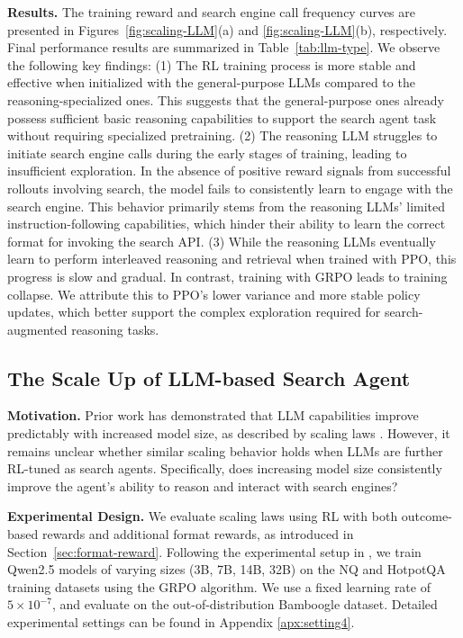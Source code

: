 \textbf{Results.}
The training reward and search engine call frequency curves are presented in Figures~\ref{fig:scaling-LLM}(a) and \ref{fig:scaling-LLM}(b), respectively.
Final performance results are summarized in Table~\ref{tab:llm-type}. We observe the following key findings:
(1) The RL training process is more stable and effective when initialized with the general-purpose LLMs compared to the reasoning-specialized ones. 
This suggests that the general-purpose ones already possess sufficient basic reasoning capabilities to support the search agent task without requiring specialized pretraining.
(2) The reasoning LLM struggles to initiate search engine calls during the early stages of training, leading to insufficient exploration. 
In the absence of positive reward signals from successful rollouts involving search, the model fails to consistently learn to engage with the search engine.
This behavior primarily stems from the reasoning LLMs' limited instruction-following capabilities, which hinder their ability to learn the correct format for invoking the search API.
(3) While the reasoning LLMs eventually learn to perform interleaved reasoning and retrieval when trained with PPO, this progress is slow and gradual. 
In contrast, training with GRPO leads to training collapse. 
We attribute this to PPO’s lower variance and more stable policy updates, which better support the complex exploration required for search-augmented reasoning tasks.

\subsection{The Scale Up of LLM-based Search Agent}\label{sec:llm-scale-up}

\textbf{Motivation.}
Prior work has demonstrated that LLM capabilities improve predictably with increased model size, as described by scaling laws \cite{hoffmann2022training, kaplan2020scaling}. However, it remains unclear whether similar scaling behavior holds when LLMs are further RL-tuned as search agents. 
Specifically, does increasing model size consistently improve the agent's ability to reason and interact with search engines?

\textbf{Experimental Design.}
We evaluate scaling laws using RL with both outcome-based rewards and additional format rewards, as introduced in Section~\ref{sec:format-reward}. 
Following the experimental setup in \cite{jin2025search}, we train Qwen2.5 models of varying sizes (3B, 7B, 14B, 32B) on the NQ and HotpotQA training datasets using the GRPO algorithm. 
We use a fixed learning rate of $5 \times 10^{-7}$, and evaluate on the out-of-distribution Bamboogle dataset.
Detailed experimental settings can be found in Appendix \ref{apx:setting4}.

